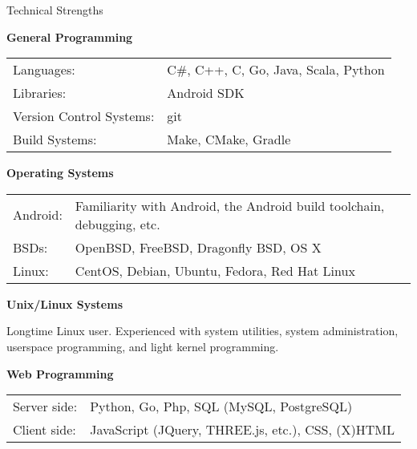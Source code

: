 \documentclass{resume} %
\newcommand{\btab}[2]{
	\bgroup
	\def\arraystretch{#1}
	\begin{tabular}{#2}
}
\newcommand{\etab}{
	\end{tabular} \smallskip
	\egroup
}
\begin{document}
\begin{rSection}{Technical Strengths}

{\bf\sffamily General Programming}

\btab{1.1}{ l l }
	Languages: &  C\#, C++, C, Go, Java, Scala, Python \\
	Libraries: & Android SDK \\
	Version Control Systems: & git \\
	Build Systems: & Make, CMake, Gradle \\
\etab

{\bf\sffamily Operating Systems}

\btab{1.1}{ l l }
	Android: & Familiarity with Android, the Android build toolchain, debugging, etc. \\
	BSDs: & OpenBSD, FreeBSD, Dragonfly BSD, OS X \\
	Linux: & CentOS, Debian, Ubuntu, Fedora, Red Hat Linux \\
\etab

{\bf\sffamily Unix/Linux Systems}

Longtime Linux user. Experienced with system utilities, system administration,
userspace programming, and light kernel programming.

{\bf\sffamily Web Programming}

\btab{1.1}{ l l }
	Server side: & Python, Go, Php, SQL (MySQL, PostgreSQL) \\
	Client side: & JavaScript (JQuery, THREE.js, etc.), CSS, (X)HTML \\
\etab

\end{rSection}
\end{document}
